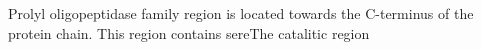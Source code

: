Prolyl oligopeptidase family region is located towards the C-terminus of the protein chain. This region contains sereThe catalitic region 